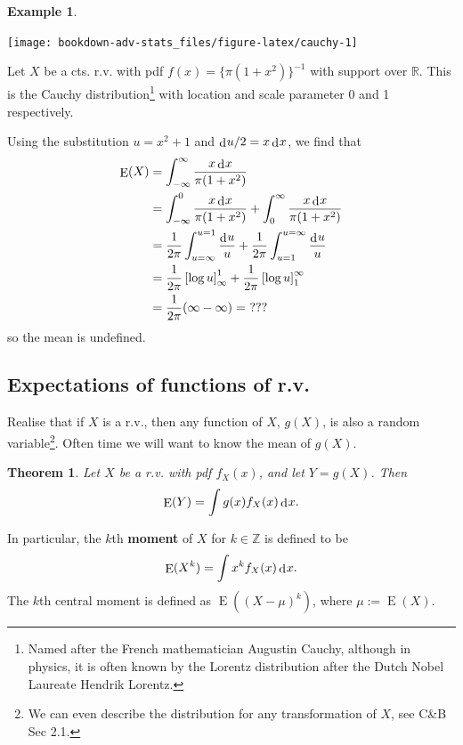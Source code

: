 \documentclass[
]{book}
\DeclareMathOperator{\E}{E}
\newcommand{\bbR}{\mathbb{R}}
\newcommand{\bbZ}{\mathbb{Z}}
\DeclareMathOperator{\dd}{d}
\newcommand{\dint}{\dd\hspace{0.5pt}\!}
\newtheorem{theorem}{Theorem}[chapter]
\theoremstyle{definition}
\theoremstyle{definition}
\newtheorem{example}{Example}[chapter]
\theoremstyle{definition}
\theoremstyle{definition}
\theoremstyle{remark}
\begin{document}
\begin{example}

\begin{center}\texttt{[image: bookdown-adv-stats\_files/figure-latex/cauchy-1]} \end{center}

Let \(X\) be a cts. r.v. with pdf \(f(x)=\{ \pi(1+x^2) \}^{-1}\) with support over \(\bbR\).
This is the Cauchy distribution\footnote{Named after the French mathematician Augustin Cauchy, although in physics, it is often known by the Lorentz distribution after the Dutch Nobel Laureate Hendrik Lorentz.} with location and scale parameter 0 and 1 respectively.

Using the substitution \(u = x^2 + 1\) and \(\dint u/2 = x \dint x\), we find that
\begin{align*}
\E(X) 
&= \int_{-\infty}^\infty \frac{x \dint x}{\pi(1+x^2)} \\
&= \int_{-\infty}^0 \frac{x \dint x}{\pi(1+x^2)} + \int_{0}^\infty \frac{x \dint x}{\pi(1+x^2)} \\
&= \frac{1}{2\pi} \int_{u=\infty}^{u=1} \frac{\dint u}{u} + \frac{1}{2\pi} \int_{u=1}^{u=\infty} \frac{\dint u}{u} \\
&= \frac{1}{2\pi} \left[\log u \right]_{\infty}^{1} + \frac{1}{2\pi} \left[\log u \right]^{\infty}_{1} \\
&= \frac{1}{2\pi} (\infty - \infty) = \ ???
\end{align*}
so the mean is undefined.

\end{example}

\hypertarget{expectations-of-functions-of-r.v.}{%
\subsection{Expectations of functions of r.v.}\label{expectations-of-functions-of-r.v.}}

Realise that if \(X\) is a r.v., then any function of \(X\), \(g(X)\), is also a random variable\footnote{We can even describe the distribution for any transformation of \(X\), see C\&B Sec 2.1.}.
Often time we will want to know the mean of \(g(X)\).

\begin{theorem}
Let \(X\) be a r.v. with pdf \(f_X(x)\), and let \(Y=g(X)\). Then
\vspace{-.5em}
\[
\E(Y) = \int g(x)f_X(x)\dint x.
\]
\end{theorem}

In particular, the \(k\)th \textbf{moment} of \(X\) for \(k\in\bbZ\) is defined to be
\[
\E(X^k) = \int x^kf_X(x)\dint x.
\]
The \(k\)th central moment is defined as \(\E((X-\mu)^k)\), where \(\mu:=\E(X)\).
\end{document}
